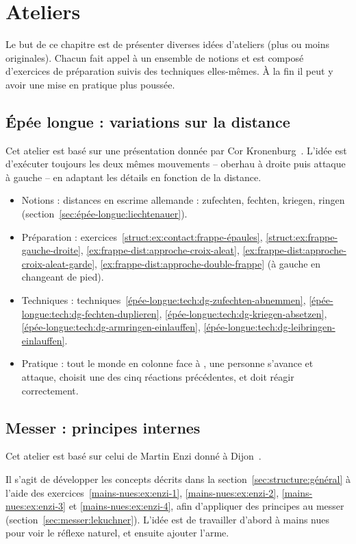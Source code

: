 \section{Ateliers}


Le but de ce chapitre est de présenter diverses idées d'ateliers (plus ou moins originales).
Chacun fait appel à un ensemble de notions et est composé d'exercices de préparation suivis des techniques elles-mêmes.
À la fin il peut y avoir une mise en pratique plus poussée.



\subsection{Épée longue : variations sur la distance}
\label{app:ateliers:épée-longue-variations-distance}

Cet atelier est basé sur une présentation donnée par Cor Kronenburg~\cite{kronenburg:dijon:going_distance:2015}.
L'idée est d'exécuter toujours les deux mêmes mouvements – oberhau à droite puis attaque à gauche – en adaptant les détails en fonction de la distance.

\begin{itemize}
	\item Notions : distances en escrime allemande : zufechten, fechten, kriegen, ringen (section~\ref{sec:épée-longue:liechtenauer}).
	\item Préparation : exercices~\ref{struct:ex:contact:frappe-épaules}, \ref{struct:ex:frappe-gauche-droite}, \ref{ex:frappe-dist:approche-croix-aleat}, \ref{ex:frappe-dist:approche-croix-aleat-garde}, \ref{ex:frappe-dist:approche-double-frappe} (à gauche en changeant de pied).
	\item Techniques : techniques~\ref{épée-longue:tech:dg-zufechten-abnemmen}, \ref{épée-longue:tech:dg-fechten-duplieren}, \ref{épée-longue:tech:dg-kriegen-absetzen}, \ref{épée-longue:tech:dg-armringen-einlauffen}, \ref{épée-longue:tech:dg-leibringen-einlauffen}.
	\item Pratique : tout le monde en colonne face à \D, une personne \A s'avance et attaque, \D choisit une des cinq réactions précédentes, et \A doit réagir correctement.
\end{itemize}


\subsection{Messer : principes internes}


Cet atelier est basé sur celui de Martin Enzi donné à Dijon~\cite{enzi:dijon:messer_inner:2015}.

Il s'agit de développer les concepts décrits dans la section~\ref{sec:structure:général} à l'aide des exercices~\ref{mains-nues:ex:enzi-1}, \ref{mains-nues:ex:enzi-2}, \ref{mains-nues:ex:enzi-3} et \ref{mains-nues:ex:enzi-4}, afin d'appliquer des principes au messer (section~\ref{sec:messer:lekuchner}).
L'idée est de travailler d'abord à mains nues pour voir le réflexe naturel, et ensuite ajouter l'arme.


